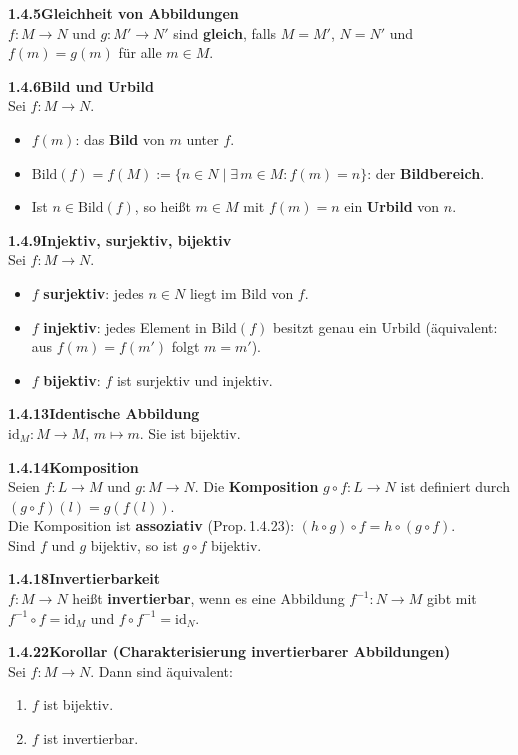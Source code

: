 \documentclass[a4paper,12pt]{article}
\newcommand{\gentry}[3]{%
  \noindent\textbf{#1\quad #2}\nopagebreak\\[0.2em]
  #3\par\smallskip
}
\begin{document}
\gentry{1.4.5}{Gleichheit von Abbildungen}{%
  $f: M \to N$ und $g: M' \to N'$ sind \textbf{gleich}, falls
  $M = M'$, $N = N'$ und $f(m) = g(m)$ für alle $m \in M$.
}

\gentry{1.4.6}{Bild und Urbild}{%
  Sei $f: M \to N$.
  \begin{itemize}[topsep=2pt,itemsep=1pt]
    \item $f(m)$: das \textbf{Bild} von $m$ unter $f$.
    \item $\mathrm{Bild}(f) = f(M) := \{n \in N \mid \exists\,m \in M: f(m) = n\}$:
          der \textbf{Bildbereich}.
    \item Ist $n \in \mathrm{Bild}(f)$, so heißt $m \in M$ mit $f(m) = n$
          ein \textbf{Urbild} von $n$.
  \end{itemize}
}

\gentry{1.4.9}{Injektiv, surjektiv, bijektiv}{%
  Sei $f: M \to N$.
  \begin{itemize}[topsep=2pt,itemsep=1pt]
    \item $f$ \textbf{surjektiv}: jedes $n \in N$ liegt im Bild von $f$.
    \item $f$ \textbf{injektiv}: jedes Element in $\mathrm{Bild}(f)$ besitzt
          genau ein Urbild
          (äquivalent: aus $f(m) = f(m')$ folgt $m = m'$).
    \item $f$ \textbf{bijektiv}: $f$ ist surjektiv und injektiv.
  \end{itemize}
}

\gentry{1.4.13}{Identische Abbildung}{%
  $\mathrm{id}_M: M \to M$, $m \mapsto m$. Sie ist bijektiv.
}

\gentry{1.4.14}{Komposition}{%
  Seien $f: L \to M$ und $g: M \to N$. Die \textbf{Komposition}
  $g \circ f: L \to N$ ist definiert durch $(g \circ f)(l) = g(f(l))$.
  \smallskip\\
  Die Komposition ist \textbf{assoziativ} (Prop.\,1.4.23):
  $(h \circ g) \circ f = h \circ (g \circ f)$.
  \smallskip\\
  Sind $f$ und $g$ bijektiv, so ist $g \circ f$ bijektiv.
}

\gentry{1.4.18}{Invertierbarkeit}{%
  $f: M \to N$ heißt \textbf{invertierbar}, wenn es eine Abbildung
  $f^{-1}: N \to M$ gibt mit $f^{-1} \circ f = \mathrm{id}_M$ und
  $f \circ f^{-1} = \mathrm{id}_N$.
}

\gentry{1.4.22}{Korollar (Charakterisierung invertierbarer Abbildungen)}{%
  Sei $f: M \to N$. Dann sind äquivalent:
  \begin{enumerate}[label=(\alph*),topsep=2pt,itemsep=1pt]
    \item $f$ ist bijektiv.
    \item $f$ ist invertierbar.
  \end{enumerate}
}
\end{document}
